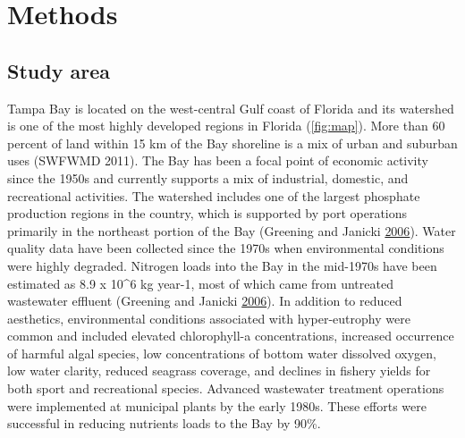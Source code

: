 \documentclass[]{article}
\begin{document}
\hypertarget{methods}{%
\section{Methods}\label{methods}}

\hypertarget{study-area}{%
\subsection{Study area}\label{study-area}}

Tampa Bay is located on the west-central Gulf coast of Florida and its
watershed is one of the most highly developed regions in Florida
(\cref{fig:map}). More than 60 percent of land within 15 km of the Bay
shoreline is a mix of urban and suburban uses (SWFWMD 2011). The Bay has
been a focal point of economic activity since the 1950s and currently
supports a mix of industrial, domestic, and recreational activities. The
watershed includes one of the largest phosphate production regions in
the country, which is supported by port operations primarily in the
northeast portion of the Bay (Greening and Janicki
\protect\hyperlink{ref-Greening06}{2006}). Water quality data have been
collected since the 1970s when environmental conditions were highly
degraded. Nitrogen loads into the Bay in the mid-1970s have been
estimated as 8.9 x 10\^{}6 kg year-1, most of which came from untreated
wastewater effluent (Greening and Janicki
\protect\hyperlink{ref-Greening06}{2006}). In addition to reduced
aesthetics, environmental conditions associated with hyper-eutrophy were
common and included elevated chlorophyll-a concentrations, increased
occurrence of harmful algal species, low concentrations of bottom water
dissolved oxygen, low water clarity, reduced seagrass coverage, and
declines in fishery yields for both sport and recreational species.
Advanced wastewater treatment operations were implemented at municipal
plants by the early 1980s. These efforts were successful in reducing
nutrients loads to the Bay by 90\%.
\end{document}
